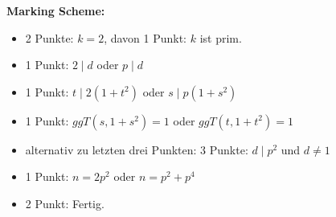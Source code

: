 \documentclass[language=german,style=solution]{smo}
\begin{document}
\begin{enumerate}
\textbf{Marking Scheme:}
\begin{itemize}
\item 2 Punkte: $k=2$, davon 1 Punkt: $k$ ist prim.
\item 1 Punkt: $2\mid d$ oder $p\mid d$
\item 1 Punkt: $t\mid 2(1+t^2)$ oder $s\mid p(1+s^2)$
\item 1 Punkt: $ggT(s, 1+s^2)=1$ oder $ggT(t, 1+t^2)=1$
\item alternativ zu letzten drei Punkten: 3 Punkte: $d\mid p^2$ und $d\neq 1$
\item 1 Punkt: $n=2p^2$ oder $n=p^2+p^4$
\item 2 Punkt: Fertig.
\end{itemize}

\end{enumerate}
\end{document}
